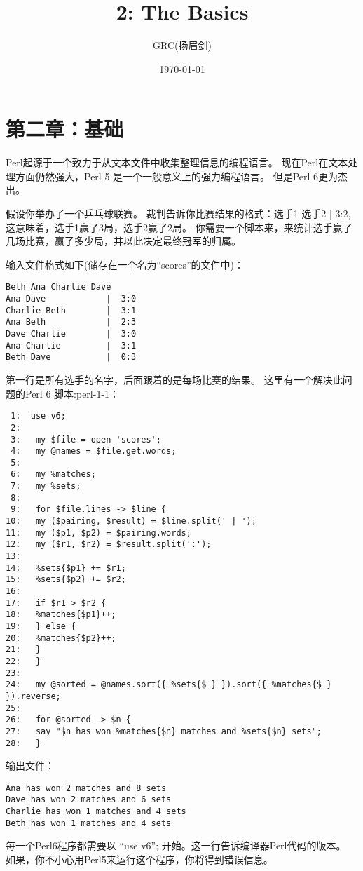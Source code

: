 \documentclass[11pt]{ctexart}
\title{2: The Basics}
\author{GRC(扬眉剑)}
\date{\today}
\begin{document}
\maketitle

\setcounter{tocdepth}{3}
\tableofcontents
\vspace*{1cm}

\section{第二章：基础}
\label{sec-1}

Perl起源于一个致力于从文本文件中收集整理信息的编程语言。
现在Perl在文本处理方面仍然强大，Perl 5 是一个一般意义上的强力编程语言。
但是Perl 6更为杰出。

假设你举办了一个乒乓球联赛。
裁判告诉你比赛结果的格式：选手1 选手2 | 3:2,这意味着，选手1赢了3局，选手2赢了2局。
你需要一个脚本来，来统计选手赢了几场比赛，赢了多少局，并以此决定最终冠军的归属。

输入文件格式如下(储存在一个名为“scores”的文件中)：

\begin{verbatim}
Beth Ana Charlie Dave 
Ana Dave            |  3:0
Charlie Beth        |  3:1
Ana Beth            |  2:3
Dave Charlie        |  3:0
Ana Charlie         |  3:1
Beth Dave           |  0:3
\end{verbatim}

第一行是所有选手的名字，后面跟着的是每场比赛的结果。
这里有一个解决此问题的Perl 6 脚本:perl-1-1：

\begin{verbatim}
 1:  use v6;
 2:  
 3:   my $file = open 'scores';
 4:   my @names = $file.get.words;
 5:  
 6:   my %matches;
 7:   my %sets;
 8:  
 9:   for $file.lines -> $line {
10:   my ($pairing, $result) = $line.split(' | ');
11:   my ($p1, $p2) = $pairing.words;
12:   my ($r1, $r2) = $result.split(':');
13:  
14:   %sets{$p1} += $r1;
15:   %sets{$p2} += $r2;
16:  
17:   if $r1 > $r2 {
18:   %matches{$p1}++;
19:   } else {
20:   %matches{$p2}++;
21:   }
22:   }
23:  
24:   my @sorted = @names.sort({ %sets{$_} }).sort({ %matches{$_} }).reverse;
25:  
26:   for @sorted -> $n {
27:   say "$n has won %matches{$n} matches and %sets{$n} sets";
28:   }
\end{verbatim}
输出文件：

\begin{verbatim}
Ana has won 2 matches and 8 sets
Dave has won 2 matches and 6 sets
Charlie has won 1 matches and 4 sets
Beth has won 1 matches and 4 sets
\end{verbatim}
每一个Perl6程序都需要以 “use v6”; 开始。这一行告诉编译器Perl代码的版本。
如果，你不小心用Perl5来运行这个程序，你将得到错误信息。
\end{document}
